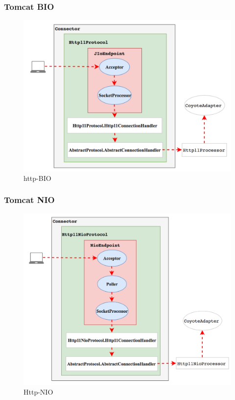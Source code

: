 \documentclass{beamer}
\begin{document}
\begin{frame}
\frametitle{Tomcat BIO}
\begin{figure}[ht]
	
	\centering
	\includegraphics[scale=0.45]{img/http-BIO.png}
	\caption{http-BIO}
	\label{fig:pathdemo1}
\end{figure}

\end{frame}

\begin{frame}
\frametitle{Tomcat NIO}
\begin{figure}[ht]
	
	\centering
	\includegraphics[scale=0.45]{img/Http-NIO.png}
	\caption{Http-NIO}
	\label{fig:pathdemo1}
\end{figure}

\end{frame}
\end{document}
